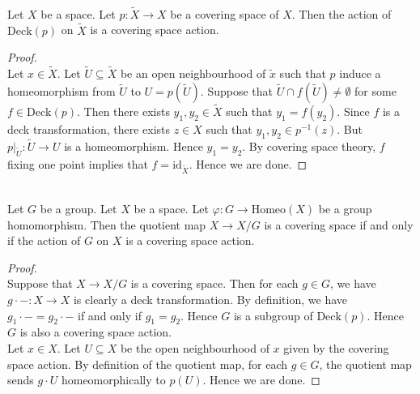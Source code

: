 \documentclass[a4paper]{article}
\begin{document}
\begin{prp}{}{}\\
Let $X$ be a space. Let $p:\widetilde{X}\to X$ be a covering space of $X$. Then the action of $\text{Deck}(p)$ on $\widetilde{X}$ is a covering space action. 
\begin{proof}\\
Let $x\in\widetilde{X}$. Let $\widetilde{U}\subseteq\widetilde{X}$ be an open neighbourhood of $\widetilde{x}$ such that $p$ induce a homeomorphism from $\widetilde{U}$ to $U=p(\widetilde{U})$. Suppose that $\widetilde{U}\cap f(\widetilde{U})\neq\emptyset$ for some $f\in\text{Deck}(p)$. Then there exists $y_1,y_2\in\widetilde{X}$ such that $y_1=f(y_2)$. Since $f$ is a deck transformation, there exists $z\in X$ such that $y_1,y_2\in p^{-1}(z)$. But $p|_{\widetilde{U}}:\widetilde{U}\to U$ is a homeomorphism. Hence $y_1=y_2$. By covering space theory, $f$ fixing one point implies that $f=\text{id}_{\widetilde{X}}$. Hence we are done. 
\end{proof}
\end{prp}

\begin{prp}{}{}\\
Let $G$ be a group. Let $X$ be a space. Let $\varphi:G\to\text{Homeo}(X)$ be a group homomorphism. Then the quotient map $X\to X/G$ is a covering space if and only if the action of $G$ on $X$ is a covering space action. 
\begin{proof}\\
Suppose that $X\to X/G$ is a covering space. Then for each $g\in G$, we have $g\cdot-:X\to X$ is clearly a deck transformation. By definition, we have $g_1\cdot -=g_2\cdot -$ if and only if $g_1=g_2$. Hence $G$ is a subgroup of $\text{Deck}(p)$. Hence $G$ is also a covering space action. \\

Let $x\in X$. Let $U\subseteq X$ be the open neighbourhood of $x$ given by the covering space action. By definition of the quotient map, for each $g\in G$, the quotient map sends $g\cdot U$ homeomorphically to $p(U)$. Hence we are done. 

\end{proof}
\end{prp}
\end{document}
